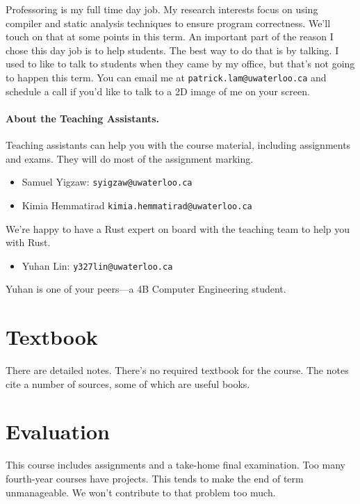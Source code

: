 \documentclass[letterpaper,10pt]{article}
\begin{document}
Professoring is my full time day job. My research interests focus on using compiler and static analysis techniques to ensure program correctness. We'll touch on that at some points in this term. An important part of the reason I chose this day job is to help students. The best way to do that is by talking. I used to like to talk to students when they came by my office, but that's not going to happen this term. You can email me at {\tt patrick.lam@uwaterloo.ca} and schedule a call if you'd like to talk to a 2D image of me on your screen.


\paragraph{About the Teaching Assistants.}

Teaching assistants can help you with the course material, including assignments and exams. They will do most of the assignment marking.



\begin{itemize}
\item Samuel Yigzaw: {\tt syigzaw@uwaterloo.ca}
\item Kimia Hemmatirad {\tt kimia.hemmatirad@uwaterloo.ca}
\end{itemize}


We're happy to have a Rust expert on board with the teaching team to help you with Rust.

\begin{itemize}
\item Yuhan Lin: {\tt y327lin@uwaterloo.ca}
\end{itemize}

Yuhan is one of your peers---a 4B Computer Engineering student.


\section*{Textbook}
There are detailed notes. There's no required textbook for the course. The notes cite a number of sources, some of which are useful books.

\section*{Evaluation}
This course includes assignments and a take-home final
examination. Too many fourth-year courses have projects. This tends to make the end of term unmanageable. We won't contribute to that problem too much.\vspace*{1em}
\end{document}
